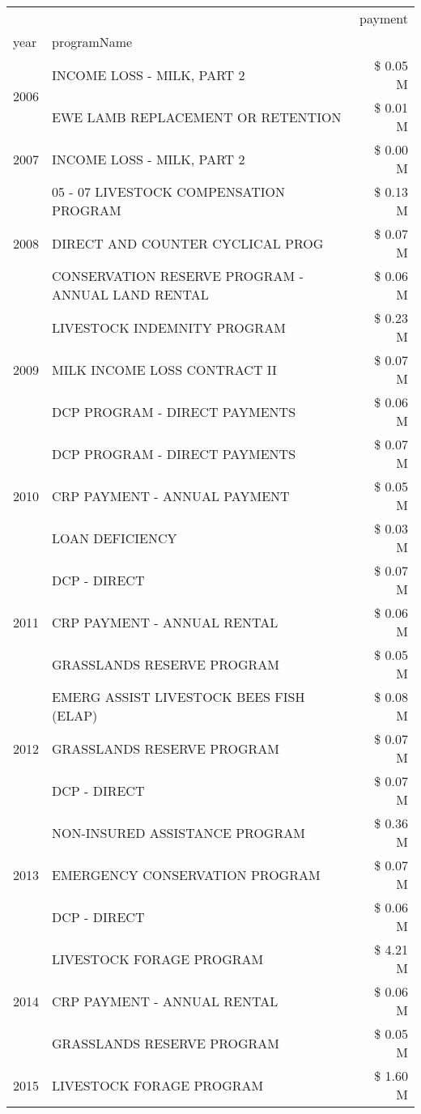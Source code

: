 \begin{tabular}{llr}
\toprule
 &  & payment \\
year & programName &  \\
\midrule
\multirow[t]{2}{*}{2006} & INCOME LOSS - MILK, PART 2 & \$ 0.05 M \\
 & EWE LAMB REPLACEMENT OR RETENTION & \$ 0.01 M \\
\cline{1-3}
2007 & INCOME LOSS - MILK, PART 2 & \$ 0.00 M \\
\cline{1-3}
\multirow[t]{3}{*}{2008} & 05 - 07 LIVESTOCK COMPENSATION PROGRAM & \$ 0.13 M \\
 & DIRECT AND COUNTER CYCLICAL PROG & \$ 0.07 M \\
 & CONSERVATION RESERVE PROGRAM - ANNUAL LAND RENTAL & \$ 0.06 M \\
\cline{1-3}
\multirow[t]{3}{*}{2009} & LIVESTOCK INDEMNITY PROGRAM & \$ 0.23 M \\
 & MILK INCOME LOSS CONTRACT II & \$ 0.07 M \\
 & DCP PROGRAM - DIRECT PAYMENTS & \$ 0.06 M \\
\cline{1-3}
\multirow[t]{3}{*}{2010} & DCP PROGRAM - DIRECT PAYMENTS & \$ 0.07 M \\
 & CRP PAYMENT - ANNUAL PAYMENT & \$ 0.05 M \\
 & LOAN DEFICIENCY & \$ 0.03 M \\
\cline{1-3}
\multirow[t]{3}{*}{2011} & DCP - DIRECT & \$ 0.07 M \\
 & CRP PAYMENT - ANNUAL RENTAL & \$ 0.06 M \\
 & GRASSLANDS RESERVE PROGRAM & \$ 0.05 M \\
\cline{1-3}
\multirow[t]{3}{*}{2012} & EMERG ASSIST LIVESTOCK BEES FISH (ELAP) & \$ 0.08 M \\
 & GRASSLANDS RESERVE PROGRAM & \$ 0.07 M \\
 & DCP - DIRECT & \$ 0.07 M \\
\cline{1-3}
\multirow[t]{3}{*}{2013} & NON-INSURED ASSISTANCE PROGRAM & \$ 0.36 M \\
 & EMERGENCY CONSERVATION PROGRAM & \$ 0.07 M \\
 & DCP - DIRECT & \$ 0.06 M \\
\cline{1-3}
\multirow[t]{3}{*}{2014} & LIVESTOCK FORAGE PROGRAM & \$ 4.21 M \\
 & CRP PAYMENT - ANNUAL RENTAL & \$ 0.06 M \\
 & GRASSLANDS RESERVE PROGRAM & \$ 0.05 M \\
\cline{1-3}
\multirow[t]{3}{*}{2015} & LIVESTOCK FORAGE PROGRAM & \$ 1.60 M \\

\end{tabular}
